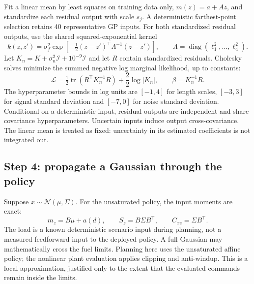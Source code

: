 Fit a linear mean by least squares on training data only, $m(z)=a+Az$, and standardize each residual output with scale $s_j$. A deterministic farthest-point selection retains 40 representative GP inputs. For both standardized residual outputs, use the shared squared-exponential kernel
\begin{equation}
 k(z,z')=\sigma_f^2\exp\left[-\tfrac12(z-z')^\top\Lambda^{-1}(z-z')\right],\qquad
 \Lambda=\operatorname{diag}(\ell_1^2,\ldots,\ell_4^2).
\end{equation}
Let $K_n=K+\sigma_n^2\mathcal I+10^{-9}\mathcal I$ and let $R$ contain standardized residuals. Cholesky solves minimize the summed negative log marginal likelihood, up to constants:
\begin{equation}
 \mathcal L=\tfrac12\operatorname{tr}(R^\top K_n^{-1}R)+\frac{2}{2}\log|K_n|,\qquad \beta=K_n^{-1}R.
\end{equation}
The hyperparameter bounds in log units are $[-1,4]$ for length scales, $[-3,3]$ for signal standard deviation and $[-7,0]$ for noise standard deviation. Conditional on a deterministic input, residual outputs are independent and share covariance hyperparameters. Uncertain inputs induce output cross-covariance. The linear mean is treated as fixed: uncertainty in its estimated coefficients is not integrated out.

\subsection{Step 4: propagate a Gaussian through the policy}
Suppose $x\sim\mathcal N(\mu,\Sigma)$. For the unsaturated policy, the input moments are exact:
\begin{equation}
 m_z=B\mu+a(d),\qquad S_z=B\Sigma B^\top,\qquad C_{xz}=\Sigma B^\top.
\end{equation}
The load is a known deterministic scenario input during planning, not a measured feedforward input to the deployed policy. A full Gaussian may mathematically cross the fuel limits. Planning here uses the unsaturated affine policy; the nonlinear plant evaluation applies clipping and anti-windup. This is a local approximation, justified only to the extent that the evaluated commands remain inside the limits.

